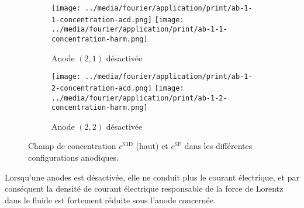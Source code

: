 \begin{figure}[h!]
  \begin{center}
    \begin{subfigure}[t]{\textwidth}
      \begin{center}
        \texttt{[image: ../media/fourier/application/print/ab-1-1-concentration-acd.png]}
        \texttt{[image: ../media/fourier/application/print/ab-1-1-concentration-harm.png]}
        \caption{Anode $(2,1)$ désactivée}
        \label{fig:}
      \end{center}
    \end{subfigure}

    \begin{subfigure}[t]{\textwidth}
      \begin{center}
        \texttt{[image: ../media/fourier/application/print/ab-1-2-concentration-acd.png]}
        \texttt{[image: ../media/fourier/application/print/ab-1-2-concentration-harm.png]}
        \caption{Anode $(2,2)$ désactivée}
        \label{fig:}
      \end{center}
    \end{subfigure}


    \caption{Champ de concentration $c^\mathrm{S3D}$ (haut) et
      $c^\mathrm{SF}$ dans les différentes configurations anodiques.}

    \label{fig:harmonic-concentration-comp-b}
  \end{center}
\end{figure}

Lorsqu'une anodes est désactivée, elle ne conduit plus le courant
électrique, et par conséquent la densité de courant électrique
responsable de la force de Lorentz dans le fluide est fortement
réduite sous l'anode concernée.

